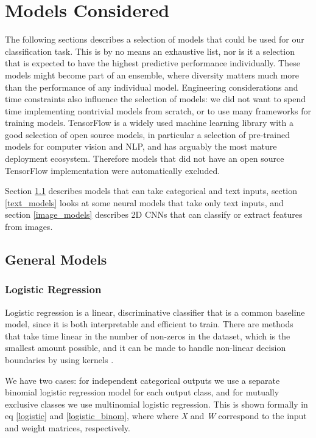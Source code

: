 \section{Models Considered}
\label{models_considered}

The following sections describes a selection of models that could be used for our classification task.
This is by no means an exhaustive list, nor is it a selection that is expected to have the highest predictive performance individually.
These models might become part of an ensemble, where diversity matters much more than the performance of any individual model.
Engineering  considerations and time constraints also influence the selection of models: we did not want to spend time implementing nontrivial models from scratch, or to use many frameworks for training models.
TensorFlow  is a widely used machine learning library with a good selection of open source models, in particular a selection of pre-trained models for computer vision and NLP, and has arguably the most mature deployment ecosystem.
Therefore models that did not have an open source TensorFlow implementation were automatically excluded.

Section \ref{general_models} describes models that can take categorical and text inputs, section \ref{text_models} looks at some neural models that take only text inputs, and section \ref{image_models} describes 2D CNNs that can classify or extract features from images.

\subsection{General Models}
\label{general_models}



\subsubsection{Logistic Regression}

Logistic regression is a linear, discriminative classifier that is a common baseline model, since it is both interpretable and efficient to train.
There are methods that take time linear in the number of non-zeros in the dataset, which is the smallest amount possible, and it can be made to handle non-linear decision boundaries by using kernels \cite{murphy}.

We have two cases: for independent categorical outputs we use a separate binomial logistic regression model for each output class, and for mutually exclusive classes we use multinomial logistic regression.
This is shown formally in eq  \ref{logistic} and \ref{logistic_binom}, where where \textit{X} and \textit{W} correspond to the input and weight matrices, respectively.

